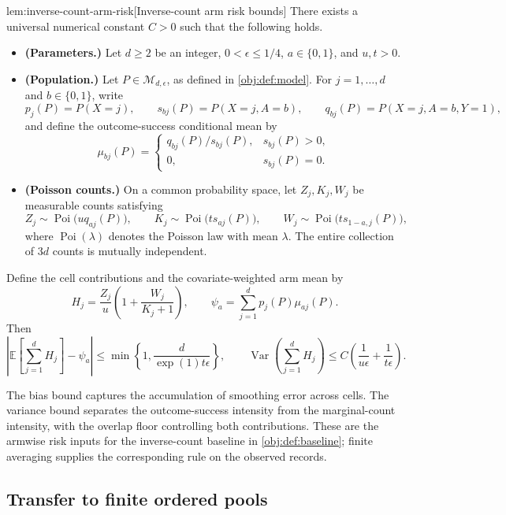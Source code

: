 \begin{lemmav}{lem:inverse-count-arm-risk}[Inverse-count arm risk bounds]
There exists a universal numerical constant \(C>0\) such that the following holds.
\begin{itemize}
\item \textbf{(Parameters.)} Let \(d\ge 2\) be an integer, \(0<\epsilon\le 1/4\), \(a\in\{0,1\}\), and \(u,t>0\).
\item \textbf{(Population.)} Let \(P\in\mathcal M_{d,\epsilon}\), as defined in \cref{obj:def:model}. For \(j=1,\ldots,d\) and \(b\in\{0,1\}\), write
\[
p_j(P)=P(X=j),\qquad
s_{bj}(P)=P(X=j,A=b),\qquad
q_{bj}(P)=P(X=j,A=b,Y=1),
\]
and define the outcome-success conditional mean by
\[
\mu_{bj}(P)=
\begin{cases}
q_{bj}(P)/s_{bj}(P),&s_{bj}(P)>0,\\
0,&s_{bj}(P)=0.
\end{cases}
\]
\item \textbf{(Poisson counts.)} On a common probability space, let \(Z_j,K_j,W_j\) be measurable counts satisfying
\[
Z_j\sim\operatorname{Poi}\!\bigl(uq_{aj}(P)\bigr),\qquad
K_j\sim\operatorname{Poi}\!\bigl(ts_{aj}(P)\bigr),\qquad
W_j\sim\operatorname{Poi}\!\bigl(ts_{1-a,j}(P)\bigr),
\]
where \(\operatorname{Poi}(\lambda)\) denotes the Poisson law with mean \(\lambda\). The entire collection of \(3d\) counts is mutually independent.
\end{itemize}
Define the cell contributions and the covariate-weighted arm mean by
\[
H_j=\frac{Z_j}{u}\left(1+\frac{W_j}{K_j+1}\right),
\qquad
\psi_a=\sum_{j=1}^{d}p_j(P)\mu_{aj}(P).
\]
Then
\[
\left|\mathbb E\!\left[\sum_{j=1}^{d}H_j\right]-\psi_a\right|
\le
\min\left\{1,\frac{d}{\exp(1)t\epsilon}\right\},
\qquad
\operatorname{Var}\!\left(\sum_{j=1}^{d}H_j\right)
\le
C\left(\frac{1}{u\epsilon}+\frac{1}{t\epsilon}\right).
\]
\end{lemmav}

The bias bound captures the accumulation of smoothing error across cells. The variance bound separates the outcome-success intensity from the marginal-count intensity, with the overlap floor controlling both contributions. These are the armwise risk inputs for the inverse-count baseline in \cref{obj:def:baseline}; finite averaging supplies the corresponding rule on the observed records.

\subsection{Transfer to finite ordered pools}

